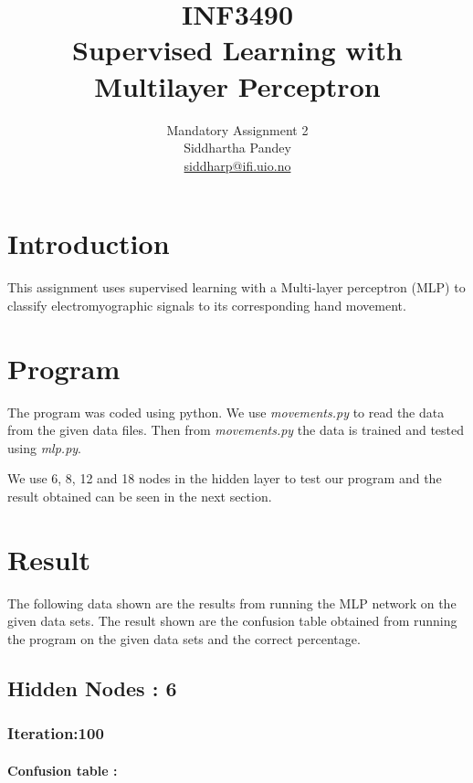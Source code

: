 \documentclass[12pt]{article}
\title{INF3490 \\ Supervised Learning with Multilayer Perceptron}
\author{
Mandatory Assignment 2\\
Siddhartha Pandey\\
\href{mailto:siddharp@ifi.uio.no}{siddharp@ifi.uio.no}
}
\begin{document}
\maketitle




\section*{Introduction}
This assignment uses supervised learning with a Multi-layer perceptron (MLP) to classify electromyographic signals to its corresponding hand movement. 


\section*{Program}

The program was coded using python. We use \textit{movements.py} to read the data from the given data files. Then from  \textit{movements.py} the data is trained and tested using \textit{mlp.py}. 

We use 6, 8, 12 and 18 nodes in the hidden layer to test our program and the result obtained can be seen in the next section.

\section*{Result} 

The following data shown are the results from running the MLP network on the given data sets.
The result shown are the confusion table obtained from running the program on the given data sets and the correct percentage.




\subsection*{Hidden Nodes : 6}  

\subsubsection*{Iteration:100}
\paragraph*{Confusion table :}
\end{document}
